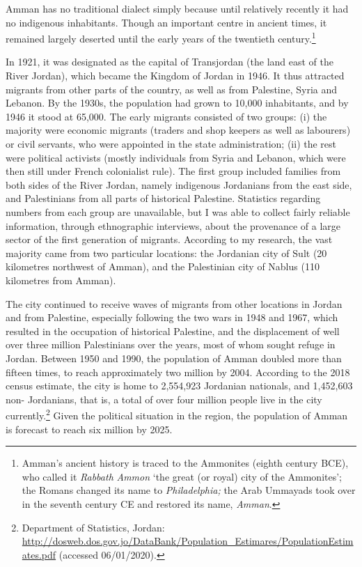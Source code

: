 \documentclass[output=paper]{langsci/langscibook}
\begin{document}
Amman has no traditional dialect simply because until relatively recently it had no indigenous inhabitants. Though an important centre in ancient times, it remained largely deserted until the early years of the twentieth century.\footnote{Amman’s ancient history is traced to the Ammonites (eighth century BCE), who called it \textit{Rabbath} \textit{Ammon} ‘the great (or royal) city of the Ammonites’; the Romans changed its name to \textit{Philadelphia;} the Arab Ummayads took over in the seventh century CE and restored its  name, \textit{Amman}.}

In 1921, it was designated as the capital of Transjordan (the land east of the River Jordan), which became the Kingdom of Jordan in 1946. It thus attracted migrants from other parts of the country, as well as from Palestine, Syria and Lebanon. By the 1930s, the population had grown to 10,000 inhabitants, and by 1946 it stood at 65,000. The early migrants consisted of two groups: (i) the majority were economic migrants (traders and shop keepers as well as labourers) or civil servants, who were appointed in the state administration; (ii) the rest were political activists (mostly individuals from Syria and Lebanon, which were then still under French colonialist rule). The first group included families from both sides of the River Jordan, namely indigenous Jordanians from the east side, and Palestinians from all parts of historical Palestine. Statistics regarding numbers from each group are unavailable, but I was able to collect fairly reliable information, through ethnographic interviews, about the provenance of a large sector of the first generation of migrants. According to my research, the vast majority came from two particular locations: the Jordanian city of Sult (20 kilometres northwest of Amman), and the Palestinian city of Nablus (110 kilometres from Amman).

The city continued to receive waves of migrants from other locations in Jordan and from Palestine, especially following the two wars in 1948 and 1967, which resulted in the occupation of historical Palestine, and the displacement of well over three million Palestinians over the years, most of whom sought refuge in Jordan. Between 1950 and 1990, the population of Amman doubled more than fifteen times, to reach approximately two million by 2004. According to the 2018 census estimate, the city is home to 2,554,923 Jordanian nationals, and 1,452,603 non- Jordanians, that is, a total of over four million people live in the city currently.\footnote{Department of Statistics, Jordan: \url{http://dosweb.dos.gov.jo/DataBank/Population_Estimares/PopulationEstimates.pdf} (accessed 06/01/2020).} Given the political situation in the region, the population of Amman is forecast to reach six million by 2025. 
\end{document}
